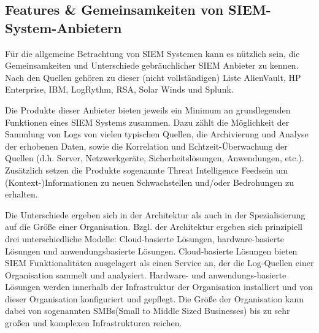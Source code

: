 \subsection{Features \&  Gemeinsamkeiten von SIEM-System-Anbietern}
Für die allgemeine Betrachtung von SIEM Systemen kann es nützlich sein, die Gemeinsamkeiten und Unterschiede gebräuchlicher SIEM Anbieter zu kennen. Nach den Quellen
gehören zu dieser (nicht vollständigen) Liste AlienVault, HP Enterprise, IBM, LogRythm, RSA, Solar Winds und Splunk. 

Die Produkte dieser Anbieter bieten jeweils ein Minimum an grundlegenden Funktionen eines SIEM Systems zusammen. Dazu zählt die Möglichkeit der Sammlung von Logs von vielen typischen Quellen, die Archivierung und Analyse der erhobenen Daten, sowie die Korrelation und Echtzeit-Überwachung der Quellen (d.h. Server, Netzwerkgeräte, Sicherheitslösungen, Anwendungen, etc.). Zusätzlich setzen die Produkte sogenannte \glqq Threat Intelligence Feeds\grqq  ein um (Kontext-)Informationen zu neuen Schwachstellen und/oder Bedrohungen zu erhalten. 


Die Unterschiede ergeben sich in der Architektur als auch in der Spezialisierung auf die Größe einer Organisation. 
Bzgl. der Architektur ergeben sich prinzipiell drei unterschiedliche Modelle: Cloud-basierte Lösungen, hardware-basierte Lösungen und anwendungsbasierte Lösungen. Cloud-basierte Lösungen bieten SIEM Funktionalitäten ausgelagert als einen Service an, der die Log-Quellen einer Organisation sammelt und analysiert. Hardware- und anwendungs-basierte Lösungen werden innerhalb der Infrastruktur der Organisation installiert und von dieser Organisation konfiguriert und gepflegt. Die Größe der Organisation kann dabei von sogenannten \glqq SMBs\grqq  (Small to Middle Sized Businesses) bis zu sehr großen und komplexen Infrastrukturen reichen.

